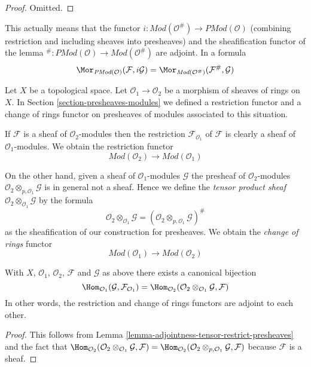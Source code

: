 \begin{proof}
Omitted.
\end{proof}

\noindent
This actually means that the functor
$i : \textit{Mod}(\mathcal{O}^\#) \to \textit{PMod}(\mathcal{O})$
(combining restriction and including sheaves into presheaves)
and the sheafification functor of the lemma
${}^\# : \textit{PMod}(\mathcal{O}) \to \textit{Mod}(\mathcal{O}^\#)$
are adjoint. In a formula
$$
\Mor_{\textit{PMod}(\mathcal{O})}(\mathcal{F}, i\mathcal{G})
=
\Mor_{\textit{Mod}(\mathcal{O}^\#)}(\mathcal{F}^\#, \mathcal{G})
$$

\medskip\noindent
Let $X$ be a topological space.
Let $\mathcal{O}_1 \to \mathcal{O}_2$ be
a morphism of sheaves of rings on $X$.
In Section \ref{section-presheaves-modules}
we defined a restriction functor
and a change of rings functor on presheaves of modules
associated to this situation.

\medskip\noindent
If $\mathcal{F}$ is a sheaf of $\mathcal{O}_2$-modules
then the restriction $\mathcal{F}_{\mathcal{O}_1}$
of $\mathcal{F}$ is clearly a sheaf
of $\mathcal{O}_1$-modules. We obtain the restriction functor
$$
\textit{Mod}(\mathcal{O}_2)
\longrightarrow
\textit{Mod}(\mathcal{O}_1)
$$

\medskip\noindent
On the other hand, given a sheaf of $\mathcal{O}_1$-modules
$\mathcal{G}$ the presheaf of $\mathcal{O}_2$-modules
$\mathcal{O}_2 \otimes_{p, \mathcal{O}_1} \mathcal{G}$
is in general not a sheaf. Hence we define the
{\it tensor product sheaf}
$\mathcal{O}_2 \otimes_{\mathcal{O}_1} \mathcal{G}$
by the formula
$$
\mathcal{O}_2 \otimes_{\mathcal{O}_1} \mathcal{G}
=
(\mathcal{O}_2 \otimes_{p, \mathcal{O}_1} \mathcal{G})^\#
$$
as the sheafification of our construction for presheaves.
We obtain the {\it change of rings} functor
$$
\textit{Mod}(\mathcal{O}_1)
\longrightarrow
\textit{Mod}(\mathcal{O}_2)
$$

\begin{lemma}
\label{lemma-adjointness-tensor-restrict}
With $X$, $\mathcal{O}_1$, $\mathcal{O}_2$, $\mathcal{F}$ and
$\mathcal{G}$ as above there exists a canonical bijection
$$
\Hom_{\mathcal{O}_1}(\mathcal{G}, \mathcal{F}_{\mathcal{O}_1})
=
\Hom_{\mathcal{O}_2}(
\mathcal{O}_2 \otimes_{\mathcal{O}_1} \mathcal{G},
\mathcal{F}
)
$$
In other words, the restriction and change of rings functors
are adjoint to each other.
\end{lemma}

\begin{proof}
This follows from
Lemma \ref{lemma-adjointness-tensor-restrict-presheaves}
and the fact that
$\Hom_{\mathcal{O}_2}(
\mathcal{O}_2 \otimes_{\mathcal{O}_1} \mathcal{G},
\mathcal{F}
)
=
\Hom_{\mathcal{O}_2}(
\mathcal{O}_2 \otimes_{p, \mathcal{O}_1} \mathcal{G},
\mathcal{F}
)$
because $\mathcal{F}$ is a sheaf.
\end{proof}


